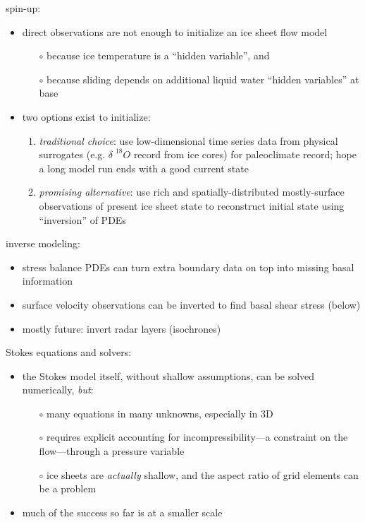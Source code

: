 \documentclass[titlepage,letterpaper,final,12pt]{scrartcl}
\newcommand{\alert}[1]{\emph{#1}}
\begin{document}
spin-up:

\begin{itemize}
\item direct observations are not enough to initialize an ice sheet flow model
  \begin{itemize}
  \item[$\circ$] because ice temperature is a ``hidden variable'', and
  \item[$\circ$] because sliding depends on additional liquid water ``hidden variables'' at base
  \end{itemize}
\item two options exist to initialize:
  \small
  \begin{enumerate}
  \item \emph{traditional choice}: use low-dimensional time series data from physical surrogates (e.g. $\delta \phantom{|}^{18}O$ record from ice cores) for paleoclimate record; hope a long model run ends with a good current state
  \item \emph{promising alternative}:  use rich and spatially-distributed mostly-surface observations of present ice sheet state to reconstruct initial state using ``inversion'' of PDEs
  \normalsize
  \end{enumerate}
\end{itemize}

inverse modeling:

\begin{itemize}
\item stress balance PDEs can turn extra boundary data on top into missing basal information
\item surface velocity observations can be inverted to find basal shear stress (below)
\item mostly future: invert radar layers (isochrones)
\end{itemize}


Stokes equations and solvers:

\begin{itemize}
\item the Stokes model itself, without shallow assumptions, can be solved numerically, \alert{but}:
  \begin{itemize}
  \item[$\circ$] many equations in many unknowns, especially in 3D
  \item[$\circ$] requires explicit accounting for incompressibility---a constraint on the flow---through a pressure variable
  \item[$\circ$] ice sheets are \emph{actually} shallow, and the aspect ratio of grid elements can be a problem
  \end{itemize}
\item much of the success so far is at a smaller scale
\end{itemize}
\end{document}
